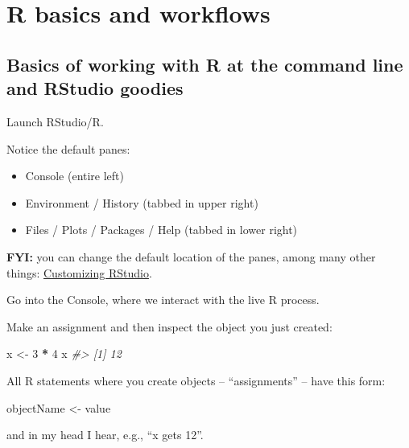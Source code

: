 \documentclass[
]{book}
\newenvironment{Shaded}{\begin{snugshade}}{\end{snugshade}}
\newcommand{\CommentTok}[1]{\textcolor[rgb]{0.56,0.35,0.01}{\textit{#1}}}
\newcommand{\DecValTok}[1]{\textcolor[rgb]{0.00,0.00,0.81}{#1}}
\newcommand{\NormalTok}[1]{#1}
\newcommand{\OperatorTok}[1]{\textcolor[rgb]{0.81,0.36,0.00}{\textbf{#1}}}
\newcommand{\StringTok}[1]{\textcolor[rgb]{0.31,0.60,0.02}{#1}}
\providecommand{\tightlist}{%
  \setlength{\itemsep}{0pt}\setlength{\parskip}{0pt}}
\begin{document}
\hypertarget{r-basics}{%
\chapter{R basics and workflows}\label{r-basics}}

\hypertarget{basics-of-working-with-r-at-the-command-line-and-rstudio-goodies}{%
\section{Basics of working with R at the command line and RStudio goodies}\label{basics-of-working-with-r-at-the-command-line-and-rstudio-goodies}}

Launch RStudio/R.

Notice the default panes:

\begin{itemize}
\tightlist
\item
  Console (entire left)
\item
  Environment / History (tabbed in upper right)
\item
  Files / Plots / Packages / Help (tabbed in lower right)
\end{itemize}

\textbf{FYI:} you can change the default location of the panes, among many other things: \href{https://support.rstudio.com/hc/en-us/articles/200549016-Customizing-RStudio}{Customizing RStudio}.

Go into the Console, where we interact with the live R process.

Make an assignment and then inspect the object you just created:

\begin{Shaded}
\begin{Highlighting}[]
\NormalTok{x <-}\StringTok{ }\DecValTok{3} \OperatorTok{*}\StringTok{ }\DecValTok{4}
\NormalTok{x}
\CommentTok{#> [1] 12}
\end{Highlighting}
\end{Shaded}

All R statements where you create objects -- ``assignments'' -- have this form:

\begin{Shaded}
\begin{Highlighting}[]
\NormalTok{objectName <-}\StringTok{ }\NormalTok{value}
\end{Highlighting}
\end{Shaded}

and in my head I hear, e.g., ``x gets 12''.
\end{document}

